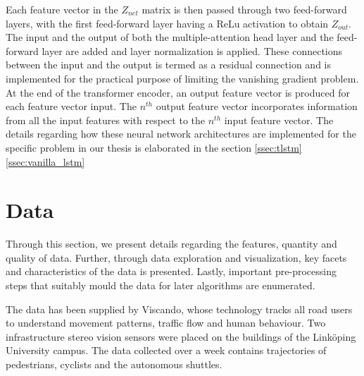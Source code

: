 \documentclass{article}
\begin{document}
Each feature vector in the $Z_{net}$ matrix is then passed through two feed-forward layers, with the first feed-forward layer having a ReLu activation to obtain $Z_{out}$. The input and the output of both the multiple-attention head layer and the feed-forward layer are added and layer normalization is applied. These connections between the input and the output is termed as a residual connection and is implemented for the practical purpose of limiting the vanishing gradient problem. At the end of the transformer encoder, an output feature vector is produced for each feature vector input. The $n^{th}$ output feature vector incorporates information from all the input features with respect to the $n^{th}$ input feature vector. The details regarding how these neural network architectures are implemented for the specific problem in our thesis is elaborated in the section \ref{ssec:tlstm}\ref{ssec:vanilla_lstm} 

\section{Data}
Through this section, we present details regarding the features, quantity and quality of data. Further, through data exploration and visualization, key facets and characteristics of the data is presented. Lastly, important pre-processing steps that suitably mould the data for later algorithms are enumerated. 

The data has been supplied by Viscando, whose technology tracks all road users to understand movement patterns, traffic flow and human behaviour. Two infrastructure stereo vision sensors were placed on the buildings of the Link\"{o}ping University campus. The data collected over a week contains trajectories of pedestrians, cyclists and the autonomous shuttles. 
\end{document}
